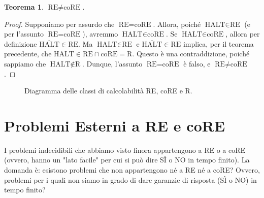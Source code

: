 \documentclass[a4paper]{article}
\newtheorem{theorem}{Teorema}
\begin{document}
\begin{theorem}
$\text{RE} \neq \text{coRE}$.
\end{theorem}
\begin{proof}
Supponiamo per assurdo che $\text{RE} = \text{coRE}$.
Allora, poiché $\text{HALT} \in \text{RE}$ (e per l'assunto $\text{RE} = \text{coRE}$), avremmo $\text{HALT} \in \text{coRE}$.
Se $\text{HALT} \in \text{coRE}$, allora per definizione $\overline{\text{HALT}} \in \text{RE}$.
Ma $\text{HALT} \in \text{RE}$ e $\overline{\text{HALT}} \in \text{RE}$ implica, per il teorema precedente, che $\text{HALT} \in \text{RE} \cap \text{coRE} = \text{R}$.
Questo è una contraddizione, poiché sappiamo che $\text{HALT} \notin \text{R}$.
Dunque, l'assunto $\text{RE} = \text{coRE}$ è falso, e $\text{RE} \neq \text{coRE}$.
\end{proof}

\begin{figure}[h]
    \centering
    \caption{Diagramma delle classi di calcolabilit\`a RE, coRE e R.}
\end{figure}

\section{Problemi Esterni a RE e coRE}
I problemi indecidibili che abbiamo visto finora appartengono a RE o a coRE (ovvero, hanno un "lato facile" per cui si può dire SÌ o NO in tempo finito). La domanda è: esistono problemi che non appartengono né a RE né a coRE? Ovvero, problemi per i quali non siamo in grado di dare garanzie di risposta (SÌ o NO) in tempo finito?
\end{document}

